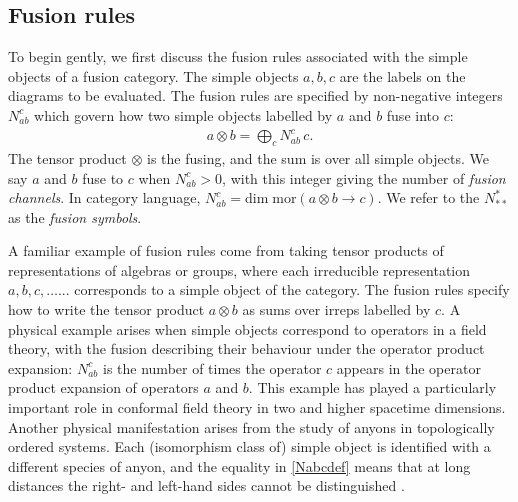 \subsection{Fusion rules}
\label{sec:fusionrules}

To begin gently, we first discuss the fusion rules associated with the simple objects of a fusion category. The simple objects $a,b,c$ are the labels on the diagrams to be evaluated. The fusion rules are specified by non-negative integers $N_{ab}^c$ which govern how two simple objects labelled by $a$ and $b$ fuse into $c$:
\begin{align}
	a \otimes b  = \bigoplus_c N_{ab}^c \, c.
\label{Nabcdef}	
\end{align}
The tensor product $\otimes$ is the fusing, and the sum is over all simple objects.
We say $a$ and $b$ fuse to $c$ when $N_{ab}^c> 0$, with this integer giving the number of \emph{fusion channels}.
In category language, $N_{ab}^c = \text{dim} \; \text{mor}( a \otimes b \rightarrow c) $. 
We refer to the $N_{\ast\ast}^\ast$ as the \emph{fusion symbols}.


A familiar example of fusion rules come from taking tensor products of representations of algebras or groups, where each irreducible representation $a,b,c,\dots...$ corresponds to a simple object of the category. The fusion rules specify how to write the tensor product $a\otimes b$ as sums over irreps labelled by $c$.  
A physical example arises when simple objects correspond to operators in a field theory,
with the fusion describing their behaviour under the operator product expansion: $N_{ab}^c$ is the number of times the operator $c$ appears in the operator product expansion of operators $a$ and $b$.
This example has played a particularly important role in conformal field theory in two \cite{MooreSeiberg:89,MSReview89} and higher \cite{Poland2018} spacetime dimensions. 
Another physical manifestation arises from the study of anyons in topologically ordered systems.
Each (isomorphism class of) simple object is identified with a different species of anyon, and the equality in \eqref{Nabcdef} means that at long distances the right- and left-hand sides cannot be distinguished \cite{Kitaev2006}.


